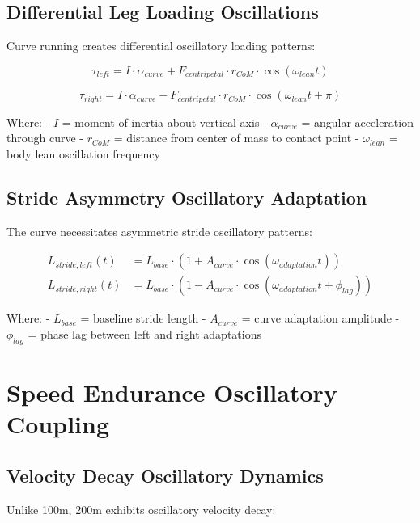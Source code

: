 \documentclass[12pt]{article}
\begin{document}
\subsection{Differential Leg Loading Oscillations}

Curve running creates differential oscillatory loading patterns:

\begin{equation}
\tau_{left} = I \cdot \alpha_{curve} + F_{centripetal} \cdot r_{CoM} \cdot \cos(\omega_{lean}t)
\end{equation}

\begin{equation}
\tau_{right} = I \cdot \alpha_{curve} - F_{centripetal} \cdot r_{CoM} \cdot \cos(\omega_{lean}t + \pi)
\end{equation}

Where:
- $I$ = moment of inertia about vertical axis
- $\alpha_{curve}$ = angular acceleration through curve
- $r_{CoM}$ = distance from center of mass to contact point
- $\omega_{lean}$ = body lean oscillation frequency

\subsection{Stride Asymmetry Oscillatory Adaptation}

The curve necessitates asymmetric stride oscillatory patterns:

\begin{align}
L_{stride,left}(t) &= L_{base} \cdot \left(1 + A_{curve} \cdot \cos(\omega_{adaptation}t)\right) \\
L_{stride,right}(t) &= L_{base} \cdot \left(1 - A_{curve} \cdot \cos(\omega_{adaptation}t + \phi_{lag})\right)
\end{align}

Where:
- $L_{base}$ = baseline stride length
- $A_{curve}$ = curve adaptation amplitude
- $\phi_{lag}$ = phase lag between left and right adaptations

\section{Speed Endurance Oscillatory Coupling}

\subsection{Velocity Decay Oscillatory Dynamics}

Unlike 100m, 200m exhibits oscillatory velocity decay:
\end{document}

